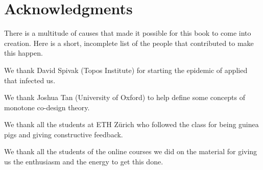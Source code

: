 
\section{Acknowledgments}

There is a multitude of causes that made it possible for this book to come into creation.
Here is a short, incomplete list of the people that contributed to make this happen.

We thank David Spivak (Topos Institute) for starting the epidemic of applied  that infected us.

We thank Joshua Tan (University of Oxford) to help define some concepts of monotone co-design theory.

We thank all the students at ETH Zürich who followed the class for being guinea pigs and giving constructive feedback.

We thank all the students of the online courses we did on the material for giving us the enthusiasm and the energy to get this done.


\begin{comment}
An incomplete list of students to thank for their feedback: Linus Schoch

\end{comment}
